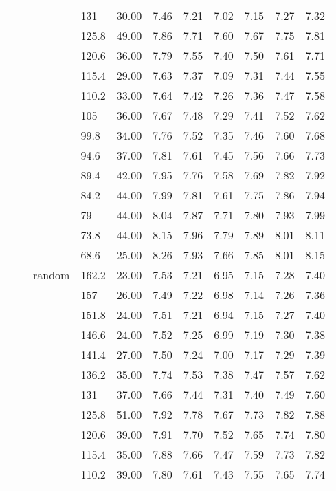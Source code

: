 \begin{longtable}{llllrrrrrrr}
   &  &  & 131 & 30.00 & 7.46 & 7.21 & 7.02 & 7.15 & 7.27 & 7.32 \\ 
   &  &  & 125.8 & 49.00 & 7.86 & 7.71 & 7.60 & 7.67 & 7.75 & 7.81 \\ 
   &  &  & 120.6 & 36.00 & 7.79 & 7.55 & 7.40 & 7.50 & 7.61 & 7.71 \\ 
   &  &  & 115.4 & 29.00 & 7.63 & 7.37 & 7.09 & 7.31 & 7.44 & 7.55 \\ 
   &  &  & 110.2 & 33.00 & 7.64 & 7.42 & 7.26 & 7.36 & 7.47 & 7.58 \\ 
   &  &  & 105 & 36.00 & 7.67 & 7.48 & 7.29 & 7.41 & 7.52 & 7.62 \\ 
   &  &  & 99.8 & 34.00 & 7.76 & 7.52 & 7.35 & 7.46 & 7.60 & 7.68 \\ 
   &  &  & 94.6 & 37.00 & 7.81 & 7.61 & 7.45 & 7.56 & 7.66 & 7.73 \\ 
   &  &  & 89.4 & 42.00 & 7.95 & 7.76 & 7.58 & 7.69 & 7.82 & 7.92 \\ 
   &  &  & 84.2 & 44.00 & 7.99 & 7.81 & 7.61 & 7.75 & 7.86 & 7.94 \\ 
   &  &  & 79 & 44.00 & 8.04 & 7.87 & 7.71 & 7.80 & 7.93 & 7.99 \\ 
   &  &  & 73.8 & 44.00 & 8.15 & 7.96 & 7.79 & 7.89 & 8.01 & 8.11 \\ 
   &  &  & 68.6 & 25.00 & 8.26 & 7.93 & 7.66 & 7.85 & 8.01 & 8.15 \\ 
   &  & random & 162.2 & 23.00 & 7.53 & 7.21 & 6.95 & 7.15 & 7.28 & 7.40 \\ 
   &  &  & 157 & 26.00 & 7.49 & 7.22 & 6.98 & 7.14 & 7.26 & 7.36 \\ 
   &  &  & 151.8 & 24.00 & 7.51 & 7.21 & 6.94 & 7.15 & 7.27 & 7.40 \\ 
   &  &  & 146.6 & 24.00 & 7.52 & 7.25 & 6.99 & 7.19 & 7.30 & 7.38 \\ 
   &  &  & 141.4 & 27.00 & 7.50 & 7.24 & 7.00 & 7.17 & 7.29 & 7.39 \\ 
   &  &  & 136.2 & 35.00 & 7.74 & 7.53 & 7.38 & 7.47 & 7.57 & 7.62 \\ 
   &  &  & 131 & 37.00 & 7.66 & 7.44 & 7.31 & 7.40 & 7.49 & 7.60 \\ 
   &  &  & 125.8 & 51.00 & 7.92 & 7.78 & 7.67 & 7.73 & 7.82 & 7.88 \\ 
   &  &  & 120.6 & 39.00 & 7.91 & 7.70 & 7.52 & 7.65 & 7.74 & 7.80 \\ 
   &  &  & 115.4 & 35.00 & 7.88 & 7.66 & 7.47 & 7.59 & 7.73 & 7.82 \\ 
   &  &  & 110.2 & 39.00 & 7.80 & 7.61 & 7.43 & 7.55 & 7.65 & 7.74 \\ 

\end{longtable}

